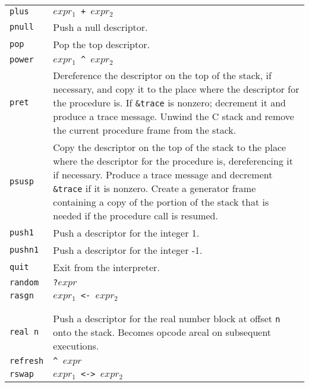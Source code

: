 \begin{xtabular}{l@{\hspace{1.5cm}}p{13.5cm}}
\texttt{plus}    & \texttt{$expr_1$ + $expr_2$}\\

\texttt{pnull}   & Push a null descriptor.\\

\texttt{pop}     & Pop the top descriptor.\\

\texttt{power}   & \texttt{$expr_1$ \textasciicircum\ $expr_2$}\\

\texttt{pret}    & Dereference the descriptor on the top of the stack, if
necessary, and copy it to the place where the descriptor for the
procedure is. If \texttt{\&trace} is nonzero; decrement it and produce a trace
message. Unwind the C stack and remove the current procedure frame
from the stack.\\

\texttt{psusp}   & Copy the descriptor on the top of the stack to the place
where the descriptor for the procedure is, dereferencing it if
necessary. Produce a trace message and decrement \texttt{\&trace} if it is
nonzero. Create a generator frame containing a copy of the portion of
the stack that is needed if the procedure call is resumed.\\

\texttt{push1}   & Push a descriptor for the integer 1.\\

\texttt{pushn1}  & Push a descriptor for the integer -1.\\

\texttt{quit}    & Exit from the interpreter.\\

\texttt{random}  & \texttt{?$expr$}\\

\texttt{rasgn}   & \texttt{$expr_1$ <- $expr_2$}\\

\\
\\

\texttt{real n}  & Push a descriptor for the real number block at offset
\texttt{n} onto the stack.  Becomes opcode areal on subsequent executions.\\

\texttt{refresh} & \texttt{\textasciicircum\ $expr$}\\

\texttt{rswap}   & \texttt{$expr_1$ <-> $expr_2$}\\


\end{xtabular}
